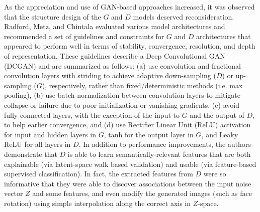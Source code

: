 \documentclass[11pt]{article}
\begin{document}
As the appreciation and use of GAN-based approaches increased, it was observed that the structure design of the $G$ and $D$ models deserved reconsideration.  Radford, Metz, and Chintala \cite{DBLP:journals/corr/RadfordMC15} evaluated various model architectures and recommended a set of guidelines and constraints for $G$ and $D$ architectures that appeared to perform well in terms of stability, convergence, resolution, and depth of representation.  These guidelines describe a Deep Convolutional GAN (DCGAN) and are summarized as follows: (a) use convolution and fractional convolution layers with striding to achieve adaptive down-sampling ($D$) or up-sampling ($G$), respectively, rather than fixed/deterministic methods (i.e. max pooling), (b) use batch normalization between convolution layers to mitigate collapse or failure due to poor initialization or vanishing gradients, (c) avoid fully-connected layers, with the exception of the input to $G$ and the output of $D$, to help earlier convergence, and (d) use Rectifier Linear Unit (ReLU) activation for input and hidden layers in $G$, tanh for the output layer in $G$, and Leaky ReLU for all layers in $D$.  In addition to performance improvements, the authors demonstrate that $D$ is able to learn semantically-relevant features that are both explainable (via latent-space walk based validation) and usable (via feature-based supervised classification).  In fact, the extracted features from $D$ were so informative that they were able to discover associations between the input noise vector $Z$ and some features, and even modify the generated images (such as face rotation) using simple interpolation along the correct axis in $Z$-space.  


\end{document}

